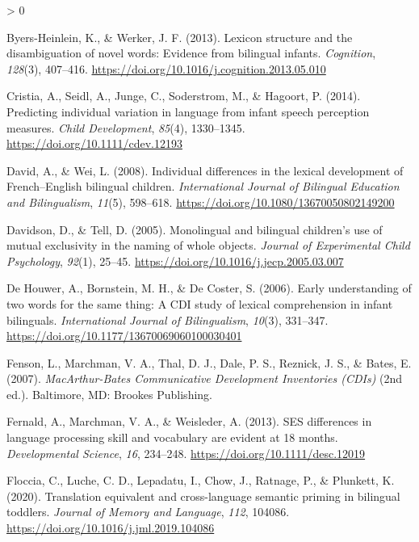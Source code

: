 \documentclass[
  english,
  ,man,floatsintext]{apa6}
\newlength{\cslhangindent}
\newenvironment{CSLReferences}[2] %
 {%
  \setlength{\parindent}{0pt}
  \ifodd #1 \everypar{\setlength{\hangindent}{\cslhangindent}}\ignorespaces\fi
  \ifnum #2 > 0
  \setlength{\parskip}{#2\baselineskip}
  \fi
 }%
 {}
\begin{document}
\begin{CSLReferences}{1}{0}
\leavevmode\hypertarget{ref-Byers-Heinlein_Werker_2013}{}%
Byers-Heinlein, K., \& Werker, J. F. (2013). Lexicon structure and the disambiguation of novel words: Evidence from bilingual infants. \emph{Cognition}, \emph{128}(3), 407--416. \url{https://doi.org/10.1016/j.cognition.2013.05.010}

\leavevmode\hypertarget{ref-Cristia_etal_2014}{}%
Cristia, A., Seidl, A., Junge, C., Soderstrom, M., \& Hagoort, P. (2014). Predicting individual variation in language from infant speech perception measures. \emph{Child Development}, \emph{85}(4), 1330--1345. \url{https://doi.org/10.1111/cdev.12193}

\leavevmode\hypertarget{ref-David_Wei_2008}{}%
David, A., \& Wei, L. (2008). Individual differences in the lexical development of {F}rench--{E}nglish bilingual children. \emph{International Journal of Bilingual Education and Bilingualism}, \emph{11}(5), 598--618. \url{https://doi.org/10.1080/13670050802149200}

\leavevmode\hypertarget{ref-Davidson_Tell_2005}{}%
Davidson, D., \& Tell, D. (2005). Monolingual and bilingual children's use of mutual exclusivity in the naming of whole objects. \emph{Journal of Experimental Child Psychology}, \emph{92}(1), 25--45. \url{https://doi.org/10.1016/j.jecp.2005.03.007}

\leavevmode\hypertarget{ref-DeHouwer_etal_2006}{}%
De Houwer, A., Bornstein, M. H., \& De Coster, S. (2006). Early understanding of two words for the same thing: A CDI study of lexical comprehension in infant bilinguals. \emph{International Journal of Bilingualism}, \emph{10}(3), 331--347. \url{https://doi.org/10.1177/13670069060100030401}

\leavevmode\hypertarget{ref-Fenson_etal_2007}{}%
Fenson, L., Marchman, V. A., Thal, D. J., Dale, P. S., Reznick, J. S., \& Bates, E. (2007). \emph{MacArthur-{B}ates {C}ommunicative {D}evelopment {I}nventories (CDIs)} (2nd ed.). Baltimore, MD: Brookes Publishing.

\leavevmode\hypertarget{ref-Fernald_etal_2013}{}%
Fernald, A., Marchman, V. A., \& Weisleder, A. (2013). SES differences in language processing skill and vocabulary are evident at 18 months. \emph{Developmental Science}, \emph{16}, 234--248. \url{https://doi.org/10.1111/desc.12019}

\leavevmode\hypertarget{ref-Floccia_etal_2020}{}%
Floccia, C., Luche, C. D., Lepadatu, I., Chow, J., Ratnage, P., \& Plunkett, K. (2020). Translation equivalent and cross-language semantic priming in bilingual toddlers. \emph{Journal of Memory and Language}, \emph{112}, 104086. \url{https://doi.org/10.1016/j.jml.2019.104086}


\end{CSLReferences}
\end{document}
